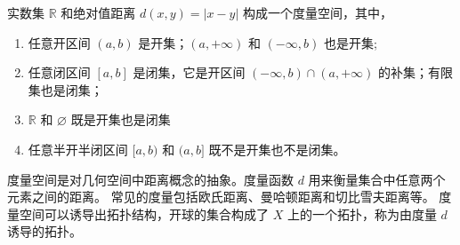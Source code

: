 \begin{example}
    实数集 $\mathbb{R}$ 和绝对值距离 $ d(x,y)=|x-y| $ 构成一个度量空间，其中，
    \begin{enumerate}
        \item 任意开区间 $ (a,b) $ 是开集；$(a,+\infty)$ 和 $(-\infty,b)$ 也是开集;
        \item 任意闭区间 $ [a,b] $ 是闭集，它是开区间 $(-\infty,b)\cap(a,+\infty)$ 的补集；有限集也是闭集；
        \item $\mathbb{R}$ 和 $\varnothing$ 既是开集也是闭集
        \item 任意半开半闭区间 $ [a,b) $ 和 $ (a,b] $ 既不是开集也不是闭集。
    \end{enumerate}
\end{example}

\vspace{1em}

\begin{note}
    度量空间是对几何空间中距离概念的抽象。度量函数 $ d $ 用来衡量集合中任意两个元素之间的距离。
    常见的度量包括欧氏距离、曼哈顿距离和切比雪夫距离等。
    度量空间可以诱导出拓扑结构，开球的集合构成了 $ X $ 上的一个拓扑，称为由度量 $ d $ 诱导的拓扑。
\end{note}




